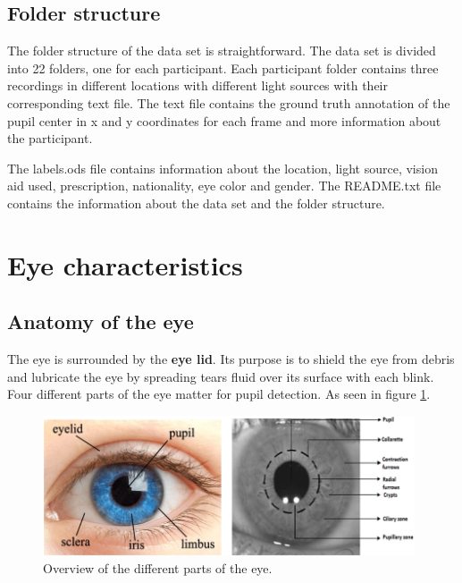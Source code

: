     \subsection{Folder structure}
    The folder structure of the data set is straightforward. The data set is divided into 22 folders, one for each participant. Each participant folder contains three recordings in different locations with different light sources with their corresponding text file.
    The text file contains the ground truth annotation of the pupil center in x and y coordinates for each frame and more information about the participant. 
    
    The labels.ods file contains information about the location, light source, vision aid used, prescription, nationality, eye color and gender. The README.txt file contains the information about the data set and the folder structure.
    \newpage
    \section{Eye characteristics}
    \subsection{Anatomy of the eye}
    The eye is surrounded by the \textbf{eye lid}. Its purpose is to shield the eye from debris and lubricate the eye by spreading tears fluid over its surface with each blink. Four different parts of the eye matter for pupil detection. As seen in figure \ref{fig:eye_anatomy}.
    \begin{figure}[h]
      \centering
      \includegraphics[width=0.98\textwidth]{plots/eye_dataset/Various-characteristics-of-an-eye-and-its-iris-texture-7.png}
      \caption{Overview of the different parts of the eye. \cite{noauthor_various_2009}}
      \label{fig:eye_anatomy}
    \end{figure}
    
